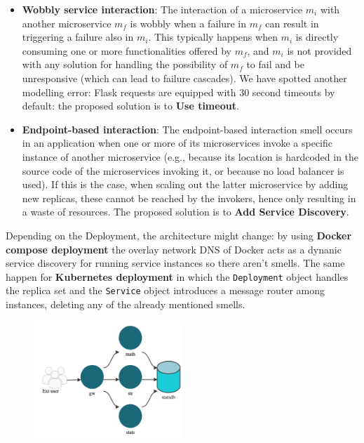 \documentclass[10pt,a4paper]{report}
\begin{document}
\begin{itemize}
	\item \textbf{Wobbly service interaction}: The interaction of a microservice $m_{i}$ with another microservice $m_{f}$ is wobbly when a failure in  $m_{f}$ can result in
	triggering a failure also in  $m_{i}$. This typically happens when  $m_{i}$ is directly consuming one or more functionalities
	offered by  $m_{f}$, and  $m_{i}$ is not provided with any solution for handling the possibility of  $m_{f}$ to fail and be 	unresponsive (which can lead to failure cascades). We have spotted another modelling error:
	Flask requests are equipped with 30 second timeouts by default: the proposed solution is to \textbf{Use timeout}. 
	
	\item \textbf{Endpoint-based interaction}: The endpoint-based interaction smell occurs in an application when one or more of its microservices invoke a specific
	instance of another microservice (e.g., because its location is hardcoded in the source code of the microservices invoking it,
	or because no load balancer is used). If this is the case, when scaling out the latter microservice by adding new replicas,
	these cannot be reached by the invokers, hence only resulting in a waste of resources. The proposed solution is to \textbf{Add Service Discovery}. 
	 
\end{itemize}
Depending on the Deployment, the architecture might change: by using \textbf{Docker compose deployment} the overlay network DNS of Docker acts as a dynanic service discovery for running service instances so there aren't smells. The same happen for \textbf{Kubernetes deployment} in which the \texttt{Deployment} object handles the replica set and the \texttt{Service} object introduces a message router among instances, deleting any of the already mentioned smells. 
\begin{figure}[h]
	\centering
	\includegraphics[width=0.5\textwidth]{image-microase}
	\caption{}
	\label{image-microase}
\end{figure}
\end{document}
